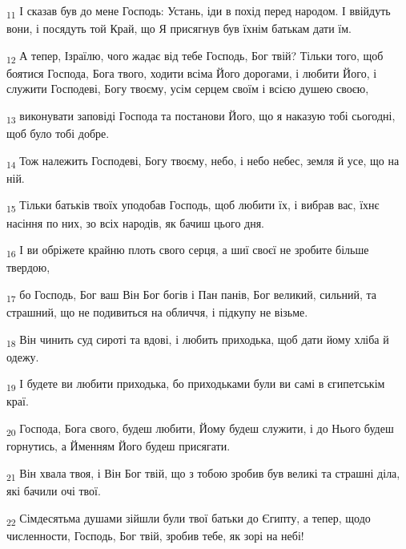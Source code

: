 \begin{tcolorbox}
\textsubscript{11} І сказав був до мене Господь: Устань, іди в похід перед народом. І ввійдуть вони, і посядуть той Край, що Я присягнув був їхнім батькам дати їм.
\end{tcolorbox}
\begin{tcolorbox}
\textsubscript{12} А тепер, Ізраїлю, чого жадає від тебе Господь, Бог твій? Тільки того, щоб боятися Господа, Бога твого, ходити всіма Його дорогами, і любити Його, і служити Господеві, Богу твоєму, усім серцем своїм і всією душею своєю,
\end{tcolorbox}
\begin{tcolorbox}
\textsubscript{13} виконувати заповіді Господа та постанови Його, що я наказую тобі сьогодні, щоб було тобі добре.
\end{tcolorbox}
\begin{tcolorbox}
\textsubscript{14} Тож належить Господеві, Богу твоєму, небо, і небо небес, земля й усе, що на ній.
\end{tcolorbox}
\begin{tcolorbox}
\textsubscript{15} Тільки батьків твоїх уподобав Господь, щоб любити їх, і вибрав вас, їхнє насіння по них, зо всіх народів, як бачиш цього дня.
\end{tcolorbox}
\begin{tcolorbox}
\textsubscript{16} І ви обріжете крайню плоть свого серця, а шиї своєї не зробите більше твердою,
\end{tcolorbox}
\begin{tcolorbox}
\textsubscript{17} бо Господь, Бог ваш Він Бог богів і Пан панів, Бог великий, сильний, та страшний, що не подивиться на обличчя, і підкупу не візьме.
\end{tcolorbox}
\begin{tcolorbox}
\textsubscript{18} Він чинить суд сироті та вдові, і любить приходька, щоб дати йому хліба й одежу.
\end{tcolorbox}
\begin{tcolorbox}
\textsubscript{19} І будете ви любити приходька, бо приходьками були ви самі в єгипетськім краї.
\end{tcolorbox}
\begin{tcolorbox}
\textsubscript{20} Господа, Бога свого, будеш любити, Йому будеш служити, і до Нього будеш горнутись, а Йменням Його будеш присягати.
\end{tcolorbox}
\begin{tcolorbox}
\textsubscript{21} Він хвала твоя, і Він Бог твій, що з тобою зробив був великі та страшні діла, які бачили очі твої.
\end{tcolorbox}
\begin{tcolorbox}
\textsubscript{22} Сімдесятьма душами зійшли були твої батьки до Єгипту, а тепер, щодо численности, Господь, Бог твій, зробив тебе, як зорі на небі!
\end{tcolorbox}
